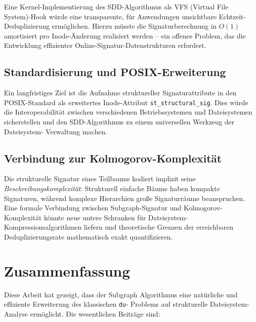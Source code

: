 ﻿\documentclass[a4paper,12pt]{article}
\theoremstyle{definition}
\begin{document}
Eine Kernel-Implementierung des SDD-Algorithmus als VFS (Virtual File
System)-Hook w\"urde eine transparente, f\"ur Anwendungen unsichtbare
Echtzeit-Deduplizierung erm\"oglichen. Hierzu m\"usste die Signaturberechnung
in $O(1)$ amortisiert pro Inode-\"Anderung realisiert werden -- ein offenes
Problem, das die Entwicklung effizienter Online-Signatur-Datenstrukturen
erfordert.

\subsection{Standardisierung und POSIX-Erweiterung}

Ein langfristiges Ziel ist die Aufnahme struktureller Signaturattribute
in den POSIX-Standard als erweitertes Inode-Attribut
\texttt{st\_structural\_sig}. Dies w\"urde die Interoperabilit\"at zwischen
verschiedenen Betriebssystemen und Dateisystemen sicherstellen und
den SDD-Algorithmus zu einem universellen Werkzeug der Dateisystem-
Verwaltung machen.

\subsection{Verbindung zur Kolmogorov-Komplexit\"at}

Die strukturelle Signatur eines Teilbaums kodiert implizit seine
\emph{Beschreibungskomplexit\"at}: Strukturell einfache B\"aume haben
kompakte Signaturen, w\"ahrend komplexe Hierarchien gro\ss{}e
Signaturr\"aume beanspruchen. Eine formale Verbindung zwischen
Subgraph-Signatur und Kolmogorov-Komplexit\"at k\"onnte neue untere
Schranken f\"ur Dateisystem-Kompressionsalgorithmen liefern und
theoretische Grenzen der erreichbaren Deduplizierungsrate mathematisch
exakt quantifizieren.

\section{Zusammenfassung}

Diese Arbeit hat gezeigt, dass der Subgraph Algorithmus \cite{epp2026subgraph}
eine nat\"urliche und effiziente Erweiterung des klassischen \texttt{du}-
Problems auf strukturelle Dateisystem-Analyse erm\"oglicht. Die
wesentlichen Beitr\"age sind:
\end{document}
